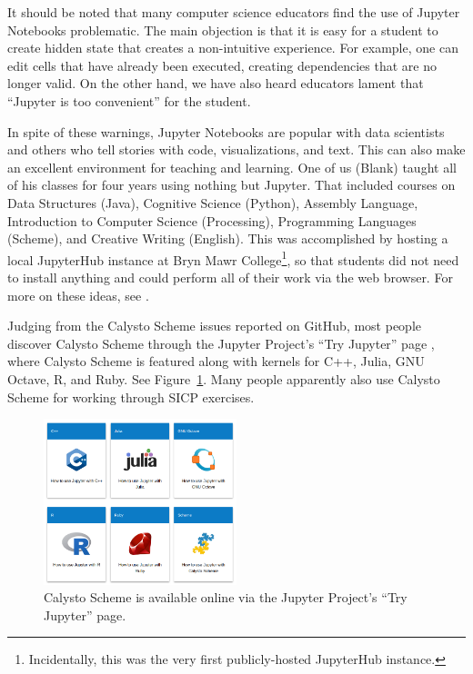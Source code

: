 \documentclass[acmsmall,screen,authorversion]{acmart}
\begin{document}
It should be noted that many computer science educators find the use
of Jupyter Notebooks problematic. The main objection is that it is
easy for a student to create hidden state that creates a non-intuitive
experience. For example, one can edit cells that have already been
executed, creating dependencies that are no longer valid. On the other
hand, we have also heard educators lament that ``Jupyter is too
convenient'' for the student.

In spite of these warnings, Jupyter Notebooks are popular with data scientists
and others who tell stories with code, visualizations, and text. This can also
make an excellent environment for teaching and learning. One of us (Blank)
taught all of his classes for four years using nothing but Jupyter. That
included courses on Data Structures (Java), Cognitive Science (Python),
Assembly Language, Introduction to Computer Science (Processing), Programming
Languages (Scheme), and Creative Writing (English). This was accomplished by
hosting a local JupyterHub instance at Bryn Mawr
College\footnote[2]{Incidentally, this was the very first publicly-hosted
  JupyterHub instance.}, so that students did not need to install anything and
could perform all of their work via the web browser. For more on these ideas,
see \cite{Calico2}.

Judging from the Calysto Scheme issues reported on GitHub, most people discover
Calysto Scheme through the Jupyter Project's ``Try Jupyter'' page
\cite{TryJupyter}, where Calysto Scheme is featured along with kernels for C++,
Julia, GNU Octave, R, and Ruby. See Figure~\ref{fig:try-jupyter}. Many people
apparently also use Calysto Scheme for working through SICP exercises.

\begin{figure}[h]
  \centering
  \includegraphics[width=0.5\textwidth]{try-jupyter.png}
  \caption{Calysto Scheme is available online via the Jupyter Project's ``Try Jupyter'' page.}
  \label{fig:try-jupyter}
\end{figure}
\end{document}
